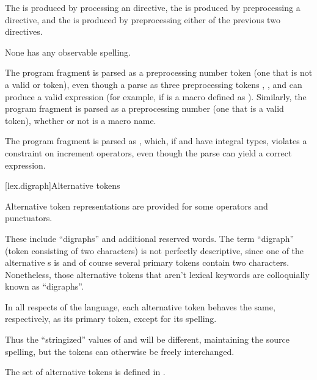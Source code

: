 \pnum
The  is produced
by processing an  directive,
the  is produced
by preprocessing a  directive, and
the  is produced
by preprocessing either of the previous two directives.
\begin{note}
None has any observable spelling.
\end{note}

\pnum
\begin{example}
The program fragment  is parsed as a
preprocessing number token (one that is not a valid
 or  token),
even though a parse as three preprocessing tokens
, \tcode{+}, and  can produce a valid expression (for example,
if  is a macro defined as ). Similarly, the
program fragment  is parsed as a preprocessing number (one
that is a valid  token),
whether or not  is a macro name.
\end{example}

\pnum
\begin{example}
The program fragment  is parsed as , which, if  and  have integral types,
violates a constraint on increment operators, even though the parse
 can yield a correct expression.
\end{example}

[lex.digraph]{Alternative tokens}

\pnum
{}%
Alternative token representations are provided for some operators and
punctuators.
\begin{footnote}
%
These include ``digraphs'' and additional reserved words. The term
``digraph'' (token consisting of two characters) is not perfectly
descriptive, since one of the alternative s is
\tcode{\%:\%:} and of course several primary tokens contain two
characters. Nonetheless, those alternative tokens that aren't lexical
keywords are colloquially known as ``digraphs''.
\end{footnote}

\pnum
In all respects of the language, each alternative token behaves the
same, respectively, as its primary token, except for its spelling.
\begin{footnote}
Thus the ``stringized'' values of
\tcode{[} and \tcode{<:} will be different, maintaining the source
spelling, but the tokens can otherwise be freely interchanged.
\end{footnote}
The set of alternative tokens is defined in
.

